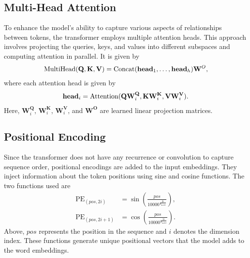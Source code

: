 \subsection{Multi-Head Attention}

To enhance the model's ability to capture various aspects of relationships between tokens, the transformer employs multiple attention heads. This approach involves projecting the queries, keys, and values into different subspaces and computing attention in parallel. It is given by
\begin{equation}
  \text{MultiHead}(\mathbf{Q},\mathbf{K},\mathbf{V})=\text{Concat}(\text{\textbf{head}}_1,\dots,\text{\textbf{head}}_h)\mathbf{W}^O,
\end{equation}\label{eq:multi-head}
where each attention head is given by
\begin{equation*}
  \text{\textbf{head}}_i=\text{Attention}(\mathbf{Q}\mathbf{W}_i^\mathbf{Q},\mathbf{K}\mathbf{W}_i^\mathbf{K},\mathbf{V}\mathbf{W}_i^\mathbf{V}).
\end{equation*}
Here, $\mathbf{W}_i^\mathbf{Q}$, $\mathbf{W}_i^\mathbf{K}$, $\mathbf{W}_i^\mathbf{V}$, and $\mathbf{W}^\mathbf{O}$ are learned linear projection matrices.

\subsection{Positional Encoding}

Since the transformer does not have any recurrence or convolution to capture sequence order, positional encodings are added to the input embeddings. They inject information about the token positions using sine and cosine functions. The two functions used are
\begin{align}
  \text{PE}_{(pos,2i)}   & =\sin\left(\frac{pos}{10000^{\frac{2i}{d_\text{model}}}}\right),\label{eq:sine-positional-encoding}   \\
  \text{PE}_{(pos,2i+1)} & =\cos\left(\frac{pos}{10000^{\frac{2i}{d_\text{model}}}}\right).\label{eq:cosine-positional-encoding}
\end{align}
Above, $pos$ represents the position in the sequence and $i$ denotes the dimension index. These functions generate unique positional vectors that the model adds to the word embeddings.

